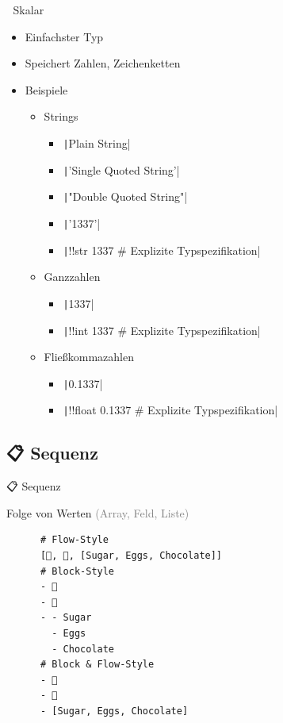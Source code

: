 \documentclass{beamer}
\begin{document}
\begin{frame}[fragile]{📏 Skalar}
  \begin{itemize}
    \item Einfachster Typ
    \item Speichert Zahlen, Zeichenketten
    \item Beispiele
    \begin{itemize}
      \item Strings
      \begin{itemize}
        \item \texttt|Plain String|
        \item \texttt|'Single Quoted String'|
        \item \texttt|"Double Quoted String"|
        \item \texttt|'1337'|
        \item \texttt|!!str 1337 # Explizite Typspezifikation|
      \end{itemize}
      \item Ganzzahlen
      \begin{itemize}
        \item \texttt|1337|
        \item \texttt|!!int 1337 # Explizite Typspezifikation|
      \end{itemize}
      \item Fließkommazahlen
      \begin{itemize}
        \item \texttt|0.1337|
        \item \texttt|!!float 0.1337 # Explizite Typspezifikation|
      \end{itemize}
    \end{itemize}
  \end{itemize}
\end{frame}

\subsection{📋 Sequenz}

\begin{frame}[fragile]{📋 Sequenz}
  \begin{block}{Folge von Werten \textcolor{gray}{(Array, Feld, Liste)}}
    \begin{verbatim}
      # Flow-Style
      [🍎, 🍊, [Sugar, Eggs, Chocolate]]
      # Block-Style
      - 🍎
      - 🍊
      - - Sugar
        - Eggs
        - Chocolate
      # Block & Flow-Style
      - 🍎
      - 🍊
      - [Sugar, Eggs, Chocolate]
    \end{verbatim}
  \end{block}
\end{frame}
\end{document}
